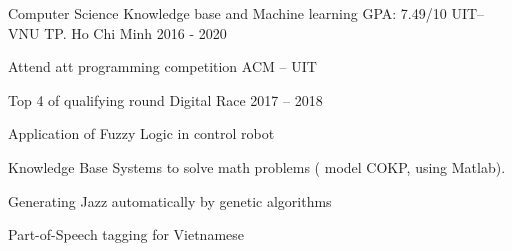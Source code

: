 
\begin{cventries}
  \cventry
    {
        Computer Science\break
        Knowledge base and Machine learning\break
        GPA: 7.49/10} %
    {UIT–VNU TP. Ho Chi Minh} %
    {2016 - 2020} %
    {} %
    {
      \begin{cvitems} %
            \item {Attend att programming competition ACM – UIT}
            \item {Top 4 of qualifying round Digital Race 2017 – 2018}
            \item {Application of Fuzzy Logic in control robot}
            \item {Knowledge Base Systems to solve math problems ( model COKP, using Matlab).}
            \item {Generating Jazz automatically by genetic algorithms}
            \item {Part-of-Speech tagging for Vietnamese}
      \end{cvitems}
    }
\end{cventries}
